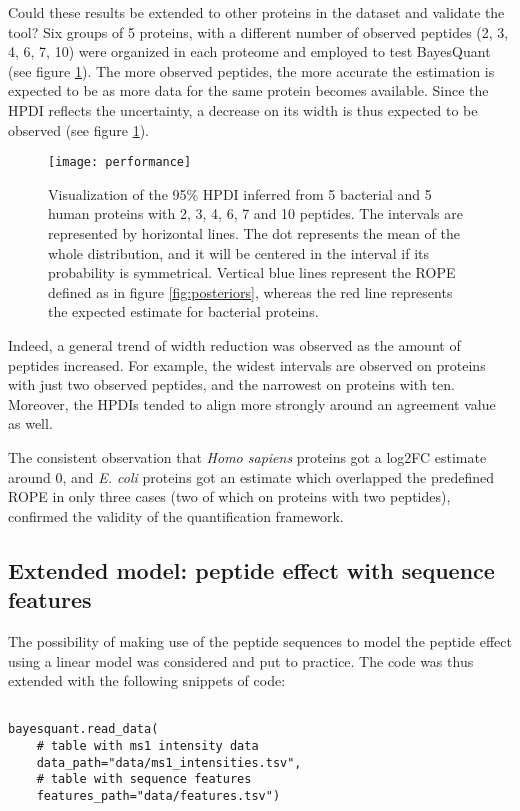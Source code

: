 Could these results be extended to other proteins in the dataset and validate the tool? Six groups of 5 proteins, with a different number of observed peptides (2, 3, 4, 6, 7, 10) were organized in each proteome and employed to test BayesQuant (see figure \ref{fig:dumbbell}). The more observed peptides, the more accurate the estimation is expected to be as more data for the same protein becomes available. Since the \ac{HPDI} reflects the uncertainty, a decrease on its width is thus expected to be observed (see figure \ref{fig:dumbbell}).

\begin{figure}[!h]
\centering
\texttt{[image: performance]}
\caption[HPDI inferred by BayesQuant]{Visualization of the 95\% \ac{HPDI} inferred from 5 bacterial and 5 human proteins with 2, 3, 4, 6, 7 and 10 peptides. The intervals are represented by horizontal lines. The dot represents the mean of the whole distribution, and it will be centered in the interval if its probability is symmetrical. Vertical blue lines represent the ROPE defined as in figure \ref{fig:posteriors}, whereas the red line represents the expected estimate for bacterial proteins.}
\label{fig:dumbbell}
\end{figure}


Indeed, a general trend of width reduction was observed as the amount of peptides increased. For example, the widest intervals are observed on proteins with just two observed peptides, and the narrowest on proteins with ten. Moreover, the \ac{HPDI}s tended to align more strongly around an agreement value as well. 

The consistent observation that \textit{Homo sapiens} proteins got a \ac{log2FC} estimate around 0, and \textit{E. coli} proteins got an estimate which overlapped the predefined \ac{ROPE} in only three cases (two of which on proteins with two peptides), confirmed the validity of the quantification framework.

\subsection{Extended model: peptide effect with sequence features}
\label{subsec:extended_model}

The possibility of making use of the peptide sequences to model the peptide effect using a linear model was considered and put to practice. The code was thus extended with the following snippets of code:

\begin{verbatim}

bayesquant.read_data(
    # table with ms1 intensity data
    data_path="data/ms1_intensities.tsv",
    # table with sequence features
    features_path="data/features.tsv")
\end{verbatim}


